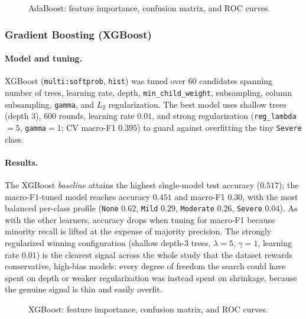 \begin{figure}[h]
    \centering
    \caption{AdaBoost: feature importance, confusion matrix, and ROC curves.}
    \label{fig:cmi_ada}
\end{figure}

\subsubsection{Gradient Boosting (XGBoost)}
\paragraph{Model and tuning.} XGBoost \cite{xgboost} (\texttt{multi:softprob}, \texttt{hist}) was tuned over $60$ candidates spanning number of trees, learning rate, depth, \texttt{min\_child\_weight}, subsampling, column subsampling, \texttt{gamma}, and $L_2$ regularization. The best model uses shallow trees (depth $3$), $600$ rounds, learning rate $0.01$, and strong regularization (\texttt{reg\_lambda}$=5$, \texttt{gamma}$=1$; CV macro-F1 $0.395$) to guard against overfitting the tiny \texttt{Severe} class.
\paragraph{Results.} The XGBoost \emph{baseline} attains the highest single-model test accuracy ($0.517$); the macro-F1-tuned model reaches accuracy $0.451$ and macro-F1 $0.30$, with the most balanced per-class profile (\texttt{None} $0.62$, \texttt{Mild} $0.29$, \texttt{Moderate} $0.26$, \texttt{Severe} $0.04$). As with the other learners, accuracy drops when tuning for macro-F1 because minority recall is lifted at the expense of majority precision. The strongly regularized winning configuration (shallow depth-$3$ trees, $\lambda=5$, $\gamma=1$, learning rate $0.01$) is the clearest signal across the whole study that the dataset rewards conservative, high-bias models: every degree of freedom the search could have spent on depth or weaker regularization was instead spent on shrinkage, because the genuine signal is thin and easily overfit.

\begin{figure}[h]
    \centering
    \caption{XGBoost: feature importance, confusion matrix, and ROC curves.}
    \label{fig:cmi_xgb}
\end{figure}

